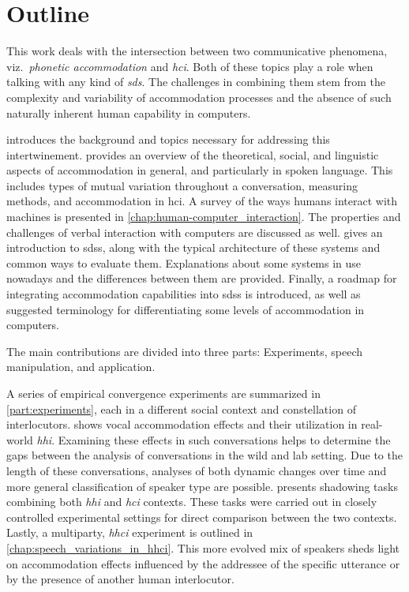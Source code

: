 \newpage
\section*{Outline}
\label{outline}
%
This work deals with the intersection between two communicative phenomena, viz.\ \emph{phonetic accommodation} and \emph{\acl{hci}}.
Both of these topics play a role when talking with any kind of \emph{\acl{sds}}.
The challenges in combining them stem from the complexity and variability of accommodation processes and the absence of such naturally inherent human capability in computers.

 introduces the background and topics necessary for addressing this intertwinement.
 provides an overview of the theoretical, social, and linguistic aspects of accommodation in general, and particularly in spoken language.
This includes types of mutual variation throughout a conversation, measuring methods, and accommodation in \acl{hci}.
A survey of the ways humans interact with machines is presented in \cref{chap:human-computer_interaction}.
The properties and challenges of verbal interaction with computers are discussed as well.
 gives an introduction to \aclp{sds}, along with the typical architecture of these systems and common ways to evaluate them.
Explanations about some systems in use nowadays and the differences between them are provided.
Finally, a roadmap for integrating accommodation capabilities into \aclp{sds} is introduced, as well as suggested terminology for differentiating some levels of accommodation in computers.

The main contributions are divided into three parts: Experiments, speech manipulation, and application.

A series of empirical convergence experiments are summarized in \cref{part:experiments}, each in a different social context and constellation of interlocutors.
 shows vocal accommodation effects and their utilization in real-world \emph{\acl{hhi}}.
Examining these effects in such conversations helps to determine the gaps between the analysis of conversations in the wild and lab setting.
Due to the length of these conversations, analyses of both dynamic changes over time and more general classification of speaker type are possible.
 presents shadowing tasks combining both \emph{\acl{hhi}} and \emph{\acl{hci}} contexts.
These tasks were carried out in closely controlled experimental settings for direct comparison between the two contexts.
Lastly, a multiparty, \emph{\acl{hhci}} experiment is outlined in \cref{chap:speech_variations_in_hhci}.
This more evolved mix of speakers sheds light on accommodation effects influenced by the addressee of the specific utterance or by the presence of another human interlocutor.

